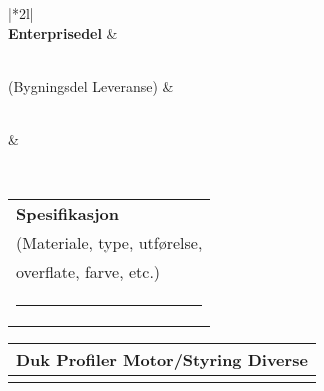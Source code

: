 \documentclass[a4paper,12pt,landscape]{article}
\begin{document}
\begin{Form}
\begin{tabular}{|*{5}{l|}}
	&
	\hspace{-0.4cm} \TextField[name=31,bordercolor=,width=5.1cm,charsize=12pt]{}
	&
	\hspace{-0.4cm} \TextField[name=32,bordercolor=,width=5.1cm,charsize=12pt]{}
	&
	\hspace{-0.4cm} \TextField[name=33,bordercolor=,width=5.1cm,charsize=12pt]{}
	&
	\hspace{-0.4cm} \rule{0pt}{16pt}\TextField[name=34,bordercolor=,width=6.27cm,charsize=12pt]{}
	\\
	\hline
\end{tabular}
\newpage
\centering
\begin{tabular}{|*{2}{l|}}
	\hline
	\\
	\hline
	\textbf{Enterprisedel}
	&
	\hspace{-0.4cm} \rule{0pt}{16pt}\TextField[name=35,bordercolor=,width=22.63cm,charsize=12pt]{}
	\\
	(Bygningsdel Leveranse)
	&
	\hspace{-0.4cm} \rule{0pt}{16pt}\TextField[name=36,bordercolor=,width=22.63cm,charsize=12pt]{}
	\\
	\hspace{4.945cm}
	&
	\hspace{-0.4cm} \rule{0pt}{16pt}\TextField[name=37,bordercolor=,width=22.63cm,charsize=12pt]{}
	\\
\end{tabular}
\centering
\begin{tabular}{|l|}
	\hline
	\rule{0pt}{16pt}\textbf{Spesifikasjon}
	\\
	\rule{0pt}{16pt}(Materiale, type, utførelse, \hspace{0pt}
	\\
	\rule{0pt}{16pt}overflate, farve, etc.)
	\\
	\rule{-4pt}{17.4pt}
	\\
\end{tabular}
\hspace{-0.3cm}
\begin{tabular}{*{4}{l|}}
	\hline
	\multicolumn{4}{l|}{\rule{0pt}{16pt}\textbf{Duk} \hspace{4.4cm} \textbf{Profiler} \hspace{3.1cm} \textbf{Motor/Styring} \hspace{2.4cm} \textbf{Diverse}}
	\\
	\hline
	\hspace{-0.4cm} \rule{0pt}{16pt}\TextField[name=39,bordercolor=,width=5.27cm,charsize=12pt]{}

\end{tabular}
\end{Form}
\end{document}
